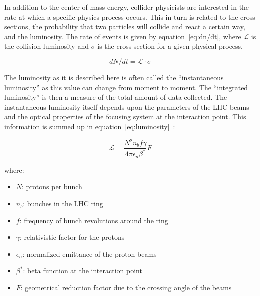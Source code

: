 In addition to the center-of-mass energy, collider physicists are interested in the rate at which a specific physics process occurs.
This in turn is related to the cross sections, the probability that two particles will collide and react a certain way, and the luminosity.
The rate of events is given by equation~\ref{eq:dn/dt}, where $\mathcal{L}$ is the collision luminosity and $\sigma$ is the cross section for a given physical process.

\begin{equation}
dN/dt=\mathcal{L}{\cdot}\sigma
\label{eq:dn/dt}
\end{equation}

The luminosity as it is described here is often called the ``instantaneous luminosity'' as this value can change from moment to moment.
The ``integrated luminosity'' is then a measure of the total amount of data collected.
The instantaneous luminosity itself depends upon the parameters of the LHC beams and the optical properties of the focusing system at the interaction point.
This information is summed up in equation~\ref{eq:luminosity}~\cite{1742-6596-455-1-012001}:

\begin{equation}
\mathcal{L}=\frac{N^{2}n_{b}f\gamma}{4\pi\epsilon_{n}\beta^{*}}F
\label{eq:luminosity}
\end{equation}

where:

\begin{itemize}
    \item $N$: protons per bunch
    \item $n_{b}$: bunches in the LHC ring
    \item $f$: frequency of bunch revolutions around the ring 
    \item $\gamma$: relativistic factor for the protons
    \item $\epsilon_{n}$: normalized emittance of the proton beams
    \item $\beta^{*}$: beta function at the interaction point
    \item $F$: geometrical reduction factor due to the crossing angle of the beams
\end{itemize}

